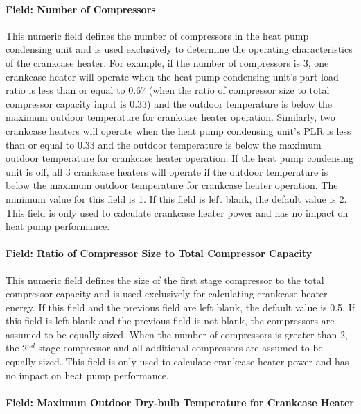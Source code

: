 \paragraph{Field: Number of Compressors}\label{field-number-of-compressors-1}

This numeric field defines the number of compressors in the heat pump condensing unit and is used exclusively to determine the operating characteristics of the crankcase heater. For example, if the number of compressors is 3, one crankcase heater will operate when the heat pump condensing unit's part-load ratio is less than or equal to 0.67 (when the ratio of compressor size to total compressor capacity input is 0.33) and the outdoor temperature is below the maximum outdoor temperature for crankcase heater operation. Similarly, two crankcase heaters will operate when the heat pump condensing unit's PLR is less than or equal to 0.33 and the outdoor temperature is below the maximum outdoor temperature for crankcase heater operation. If the heat pump condensing unit is off, all 3 crankcase heaters will operate if the outdoor temperature is below the maximum outdoor temperature for crankcase heater operation. The minimum value for this field is 1. If this field is left blank, the default value is 2. This field is only used to calculate crankcase heater power and has no impact on heat pump performance.

\paragraph{Field: Ratio of Compressor Size to Total Compressor Capacity}\label{field-ratio-of-compressor-size-to-total-compressor-capacity-1}

This numeric field defines the size of the first stage compressor to the total compressor capacity and is used exclusively for calculating crankcase heater energy. If this field and the previous field are left blank, the default value is 0.5. If this field is left blank and the previous field is not blank, the compressors are assumed to be equally sized. When the number of compressors is greater than 2, the 2\(^{nd}\) stage compressor and all additional compressors are assumed to be equally sized. This field is only used to calculate crankcase heater power and has no impact on heat pump performance.

\paragraph{Field: Maximum Outdoor Dry-bulb Temperature for Crankcase Heater}\label{field-maximum-outdoor-dry-bulb-temperature-for-crankcase-heater-1}

